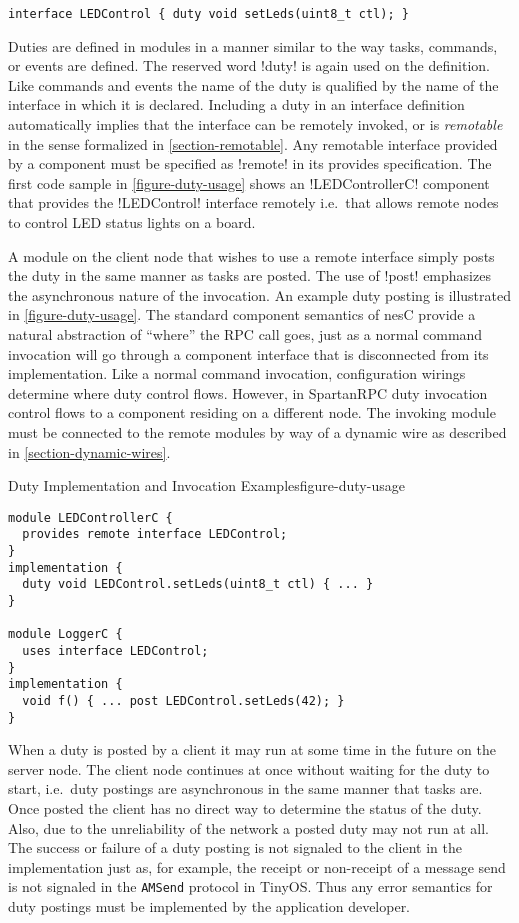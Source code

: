 \begin{lstlisting}
interface LEDControl { duty void setLeds(uint8_t ctl); }
\end{lstlisting}

Duties are defined in modules in a manner similar to the way tasks, commands, or events are
defined. The reserved word !duty! is again used on the definition. Like commands and events the
name of the duty is qualified by the name of the interface in which it is declared. Including a
duty in an interface definition automatically implies that the interface can be remotely
invoked, or is \emph{remotable} in the sense formalized in \autoref{section-remotable}. Any
remotable interface provided by a component must be specified as !remote! in its provides
specification. The first code sample in \autoref{figure-duty-usage} shows an !LEDControllerC!
component that provides the !LEDControl! interface remotely i.e.~that allows remote nodes to
control LED status lights on a board.

A module on the client node that wishes to use a remote interface simply posts the duty in the
same manner as tasks are posted. The use of !post! emphasizes the asynchronous nature of the
invocation. An example duty posting is illustrated in \autoref{figure-duty-usage}. The standard
component semantics of nesC provide a natural abstraction of ``where'' the RPC call goes, just
as a normal command invocation will go through a component interface that is disconnected from
its implementation. Like a normal command invocation, configuration wirings determine where duty
control flows. However, in SpartanRPC duty invocation control flows to a component residing on a
different node. The invoking module must be connected to the remote modules by way of a dynamic
wire as described in \autoref{section-dynamic-wires}.

\begin{fpfig}[t]{Duty Implementation and Invocation Examples}{figure-duty-usage}
{
\singlespace
\begin{lstlisting}
module LEDControllerC {
  provides remote interface LEDControl;
}
implementation {
  duty void LEDControl.setLeds(uint8_t ctl) { ... }
} 
 
module LoggerC {
  uses interface LEDControl;
}
implementation {
  void f() { ... post LEDControl.setLeds(42); }
}
\end{lstlisting}
\primaryspacing
}
\end{fpfig}

When a duty is posted by a client it may run at some time in the future on the server node. The
client node continues at once without waiting for the duty to start, i.e.~duty postings are
asynchronous in the same manner that tasks are. Once posted the client has no direct way to
determine the status of the duty. Also, due to the unreliability of the network a posted duty
may not run at all. The success or failure of a duty posting is not signaled to the client in
the implementation just as, for example, the receipt or non-receipt of a message send is not
signaled in the \texttt{AMSend} protocol in TinyOS. Thus any error semantics for duty postings
must be implemented by the application developer.

